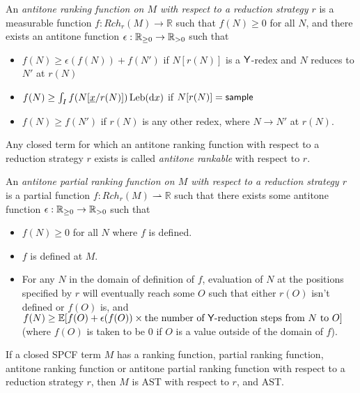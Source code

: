 \begin{definition}\rm
An \emph{antitone ranking function on $M$ with respect to a reduction strategy $r$} is a measurable function $f:\mathit{Rch}_r(M) \to \mathbb{R}$ such that $f(N) \geq 0$ for all $N$, and there exists an antitone function $\epsilon : \mathbb{R}_{{\geq}0} \to \mathbb{R}_{{>}0}$ such that
\begin{itemize}
    \item $f(N) \geq \epsilon(f(N)) + f(N')$ if $N[r(N)]$ is a $\mathsf{Y}$-redex and $N$ reduces to $N'$ at $r(N)$
    \item $f(N) \geq \int_I f(N[\underline{x}/r(N)]) \, \mathrm{Leb}(\mathrm{d}x)$ if $N[r(N)] = \mathsf{sample}$

    \item $f(N) \geq f(N')$ if $r(N)$ is any other redex, where $N \to N'$ at $r(N)$.
\end{itemize}
Any closed term for which an antitone ranking function with respect to a reduction strategy $r$ exists is called \emph{antitone rankable} with respect to $r$. 
\end{definition}

\begin{definition}
An \emph{antitone partial ranking function on $M$ with respect to a reduction strategy $r$} is a partial function $f : Rch_r(M) \rightharpoonup \mathbb R$ such that there exists some antitone function $\epsilon : \mathbb{R}_{{\geq}0} \to \mathbb{R}_{{>}0}$ such that
\begin{itemize}
    \item $f(N) \geq 0$ for all $N$ where $f$ is defined.
    \item $f$ is defined at $M$.
    \item For any $N$ in the domain of definition of $f$, evaluation of $N$ at the positions specified by $r$ will eventually reach some $O$ such that either $r(O)$ isn't defined or $f(O)$ is, and $f(N) \geq \mathbb E[f(O) + \epsilon(f(O)) \times \text{the number of $\mathsf{Y}$-reduction steps from $N$ to $O$}]$ (where $f(O)$ is taken to be 0 if $O$ is a value outside of the domain of $f$).
\end{itemize}
\end{definition}

\begin{theorem}
If a closed SPCF term $M$ has a ranking function, partial ranking function, antitone ranking function or antitone partial ranking function with respect to a reduction strategy $r$, then $M$ is AST with respect to $r$, and AST.
\end{theorem}

